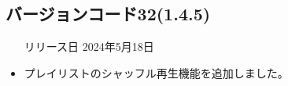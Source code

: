 \subsection*{バージョンコード32(1.4.5)}
\begin{itemize}
    \item[リリース日] 2024年5月18日
\end{itemize}

\new
\begin{itemize}
    \item プレイリストのシャッフル再生機能を追加しました。
\end{itemize}

\change

\fix

